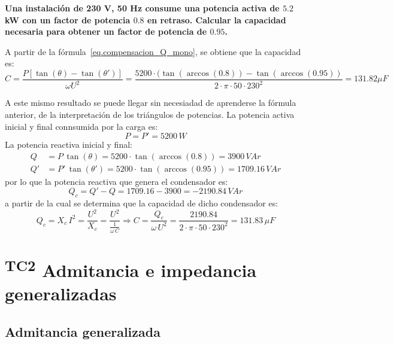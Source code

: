 \begin{example}\label{ex.condensador_Q}
  \textbf{Una instalación de 230 V, 50 Hz consume una potencia activa
    de $5.2$ kW con un factor de potencia $0.8$ en retraso. Calcular
    la capacidad necesaria para obtener un factor de potencia de
    $0.95$.}
	    
  A partir de la fórmula~\eqref{eq.compensacion_Q_mono}, se obtiene
  que la capacidad es:
  \begin{equation*}
    C=\frac{P \left[\tan (\theta) - \tan (\theta')\right]}{\omega U^2}=\dfrac{5200\cdot(\tan(\arccos(0.8))-\tan(\arccos(0.95))}{2\cdot\pi\cdot 50\cdot 230^2}=131.82\mu F
  \end{equation*}
	    
  A este mismo resultado se puede llegar sin necesiadad de aprenderse
  la fórmula anterior, de la interpretación de los triángulos de
  potencias. La potencia activa inicial y final connsumida por la
  carga es:
  \begin{equation*}
    P=P'=5200\,W
  \end{equation*}
  La potencia reactiva inicial y final:
  \begin{align*}
    Q&=P\,\tan(\theta)=5200\cdot\tan(\arccos(0.8))=3900\,VAr\\
    Q'&=P'\,\tan(\theta')=5200\cdot\tan(\arccos(0.95))=1709.16\,VAr
  \end{align*}
  por lo que la potencia reactiva que genera el condensador es:
  \begin{equation*}
    Q_c=Q'-Q=1709.16-3900=-2190.84\,VAr
  \end{equation*}
  a partir de la cual se determina que la capacidad de dicho
  condensador es:
  \begin{equation*}
    Q_c=X_c\,I^2=\dfrac{U^2}{X_c}=\dfrac{U^2}{\frac{1}{\omega\,C}}\Rightarrow C=\dfrac{Q_c}{\omega\,U^2}=\dfrac{2190.84}{2\cdot\pi\cdot 50\cdot 230^2}=131.83\,\mu F
  \end{equation*}
\end{example}
	
\section{\textsuperscript{TC2} Admitancia e impedancia generalizadas}
\label{sec:admitancia-impedancia-generalizada}

\subsection{Admitancia generalizada}
\label{sec:admitancia-generalizada}

